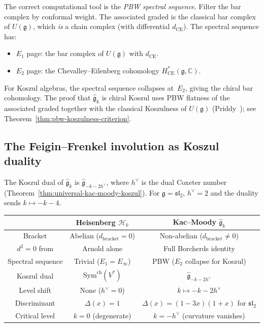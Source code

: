 The correct computational tool is the \emph{PBW spectral sequence}.
Filter the bar complex by conformal weight.  The associated graded
is the classical bar complex of $U(\mathfrak{g})$, which \emph{is}
a chain complex (with differential $d_{\mathrm{CE}}$).  The
spectral sequence has:
\begin{itemize}
\item $E_1$ page: the bar complex of $U(\mathfrak{g})$ with
  $d_{\mathrm{CE}}$.
\item $E_2$ page: the Chevalley--Eilenberg cohomology
  $H^*_{\mathrm{CE}}(\mathfrak{g}, \mathbb{C})$.
\end{itemize}
For Koszul algebras, the spectral sequence collapses at~$E_2$,
giving the chiral bar cohomology.  The proof that
$\widehat{\mathfrak{g}}_k$ is chiral Koszul uses PBW flatness
of the associated graded together with the classical Koszulness
of $U(\mathfrak{g})$ (Priddy~\cite{Priddy70}); see
Theorem~\ref{thm:pbw-koszulness-criterion}.

\subsection{The Feigin--Frenkel involution as Koszul duality}

The Koszul dual of $\widehat{\mathfrak{g}}_k$ is
$\widehat{\mathfrak{g}}_{-k-2h^\vee}$, where $h^\vee$ is the
dual Coxeter number (Theorem~\ref{thm:universal-kac-moody-koszul}).
For $\mathfrak{g} = \mathfrak{sl}_2$, $h^\vee = 2$ and the duality
sends $k \mapsto -k - 4$.

\begin{center}
\small
\begin{tabular}{c|c|c}
& \textbf{Heisenberg} $\mathcal{H}_k$ &
\textbf{Kac--Moody} $\widehat{\mathfrak{g}}_k$ \\
\hline
Bracket & Abelian ($d_{\mathrm{bracket}} = 0$)
  & Non-abelian ($d_{\mathrm{bracket}} \neq 0$) \\
$d^2 = 0$ from & Arnold alone
  & Full Borcherds identity \\
Spectral sequence & Trivial ($E_1 = E_\infty$)
  & PBW ($E_2$ collapse for Koszul) \\
Koszul dual & $\mathrm{Sym}^{\mathrm{ch}}(V^*)$
  & $\widehat{\mathfrak{g}}_{-k-2h^\vee}$ \\
Level shift & None ($h^\vee = 0$)
  & $k \mapsto -k - 2h^\vee$ \\
Discriminant & $\Delta(x) = 1$
  & $\Delta(x) = (1-3x)(1+x)$ for $\mathfrak{sl}_2$ \\
Critical level & $k = 0$ (degenerate)
  & $k = -h^\vee$ (curvature vanishes)
\end{tabular}
\end{center}

